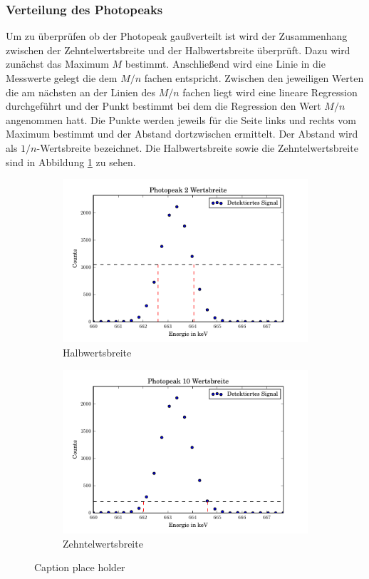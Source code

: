 \subsubsection{Verteilung des Photopeaks}
Um zu überprüfen ob der Photopeak gaußverteilt ist wird der Zusammenhang zwischen der Zehntelwertsbreite und der Halbwertsbreite überprüft. Dazu wird zunächst das Maximum $M$ bestimmt. Anschließend wird eine Linie in die Messwerte gelegt die dem $M/n$ fachen entspricht. Zwischen den jeweiligen Werten die am nächsten an der Linien des $M/n$ fachen liegt wird eine lineare Regression durchgeführt und der Punkt bestimmt bei dem die Regression den Wert $M/n$ angenommen hatt. Die Punkte werden jeweils für die Seite links und rechts vom Maximum bestimmt und der Abstand dortzwischen ermittelt. Der Abstand wird als $1/n$-Wertsbreite bezeichnet. 
Die Halbwertsbreite sowie die Zehntelwertsbreite sind in Abbildung \ref{fig:Halb} zu sehen.
\begin{figure}[htpb]
	\centering
	\begin{subfigure}[t]{0.5\textwidth}
		\centering
		\includegraphics[width=\textwidth]{./build/2Wertsbreite.pdf}
		\caption{Halbwertsbreite}
	\end{subfigure}%
	\begin{subfigure}[t]{0.5\textwidth}
		\centering
		\includegraphics[width=\textwidth]{./build/10Wertsbreite.pdf}
		\caption{Zehntelwertsbreite}
	\end{subfigure}
	\caption{Caption place holder}
	\label{fig:Halb}
\end{figure}
